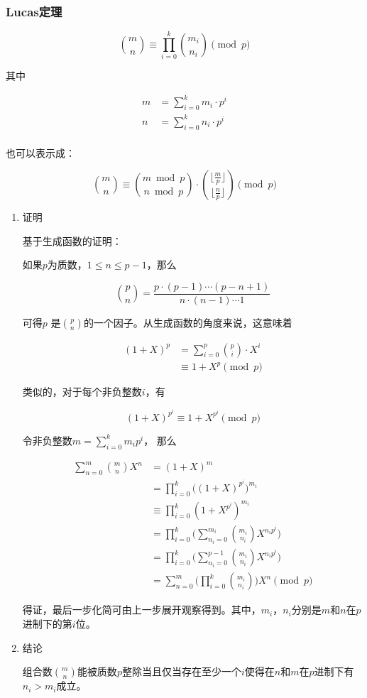 \documentclass[11pt]{article}
\begin{document}
\subsubsection{Lucas定理}
\label{sec:orgda899ae}

\[
{\binom {m}{n}}\equiv \prod _{i=0}^{k}{\binom {m_{i}}{n_{i}}}{\pmod {p}}
\]

其中

\[\begin{aligned}
m&=\sum_{i=0}^k m_i \cdot p^i\\
n&=\sum_{i=0}^k n_i \cdot p^i\\
\end{aligned}\]

也可以表示成：

\[
\binom{m}{n} \equiv \binom{m \bmod p}{n \bmod p} \cdot \binom{\lfloor\frac{m}{p} \rfloor}{\lfloor \frac{n}{p} \rfloor} \pmod p
\]

\begin{enumerate}
\item 证明
\label{sec:org6fe60d7}

基于生成函数的证明：

如果\(p\)为质数，\(1\leq n \leq p-1\)，那么

\[
\binom{p}{n} = \frac{p \cdot (p - 1) \cdots (p - n + 1)}{n \cdot (n - 1) \cdots 1}
\]

可得\(p\) 是\(\binom{p}{n}\)的一个因子。从生成函数的角度来说，这意味着

\[\begin{aligned}
(1 + X)^p &= \sum_{i=0}^p \binom{p}{i}\cdot X^i\\
&\equiv 1+X^p \pmod p
\end{aligned}\]

类似的，对于每个非负整数\(i\)，有

\[
(1+X)^{p^i} \equiv 1 + X^{p^i} \pmod p
\]

令非负整数\(m=\sum_{i=0}^k m_i p^i\)， 那么

\[\begin{aligned}
\sum_{n=0}^m \binom{m}{n}X^n &= (1 + X)^m \\
&=\prod_ {i=0}^k \Big ((1+X)^{p^i} \Big) ^{m_i}\\
&\equiv \prod_{i=0}^k(1+X^{p^i})^{m_i}\\
&=\prod_{i=0}^k\bigg ( \sum_{n_i=0}^{m_i} \binom{m_i}{n_i}X^{n_i p^i} \bigg)\\
&=\prod_{i=0}^k \bigg (\sum_{n_i=0}^{p-1} \binom{m_i}{n_i}X^{n_ip^i} \bigg)\\
&=\sum_{n=0}^m \bigg(\prod_{i=0}^k \binom{m_i}{n_i} \bigg) X^n \pmod p
\end{aligned}\]

得证，最后一步化简可由上一步展开观察得到。其中，\(m_i\)，\(n_i\)分别是\(m\)和\(n\)在\(p\)进制下的第\(i\)位。

\item 结论
\label{sec:org87d19a9}

组合数\(\binom{m}{n}\)能被质数\(p\)整除当且仅当存在至少一个\(i\)使得在\(n\)和\(m\)在\(p\)进制下有\(n_i > m_i\)成立。
\end{enumerate}
\end{document}
